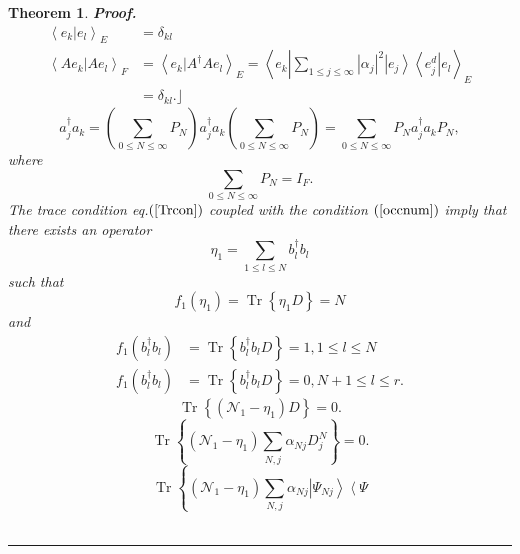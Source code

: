 \documentclass[aps,preprint]{revtex4}%
\newtheorem{theorem}{Theorem}
\newenvironment{proof}[1][Proof]{\noindent\textbf{#1.} }{\ \rule{0.5em}{0.5em}}
\begin{document}
\begin{theorem}
\begin{proof}
\begin{align}
\left\langle \left.  e_{k}\right\vert e_{l}\right\rangle _{E}  &  =\delta
_{kl}\\
\left\langle \left.  Ae_{k}\right\vert Ae_{l}\right\rangle _{F}  &
=\left\langle \left.  e_{k}\right\vert A^{\dagger}Ae_{l}\right\rangle
_{E}=\left\langle e_{k}\left\vert \sum_{1\leq j\leq\infty}\left\vert
\alpha_{j}\right\vert ^{2}\left\vert e_{j}\right\rangle \left\langle e_{j}%
^{d}\right\vert e_{l}\right.  \right\rangle _{E}\\
&  =\delta_{kl}.\rfloor
\end{align}%
\begin{equation}
a_{j}^{\dagger}a_{k}=\left(  \sum_{0\leq N\leq\infty}P_{N}\right)
a_{j}^{\dagger}a_{k}\left(  \sum_{0\leq N\leq\infty}P_{N}\right)  =\sum_{0\leq
N\leq\infty}P_{N}a_{j}^{\dagger}a_{k}P_{N},
\end{equation}
where%
\begin{equation}
\sum_{0\leq N\leq\infty}P_{N}=I_{F}.
\end{equation}
The trace condition eq.$\left(  \ref{Trcon}\right)  $ coupled with the
condition $\left(  \ref{occnum}\right)  $ imply that there exists an operator
\begin{equation}
\eta_{1}=\sum_{1\leq l\leq N}b_{l}^{\dagger}b_{l}%
\end{equation}
such that
\begin{equation}
f_{1}\left(  \eta_{1}\right)  =\operatorname*{Tr}\left\{  \eta_{1}D\right\}
=N
\end{equation}
and
\begin{align}
f_{1}\left(  b_{l}^{\dagger}b_{l}\right)   &  =\operatorname*{Tr}\left\{
b_{l}^{\dagger}b_{l}D\right\}  =1,1\leq l\leq N\\
f_{1}\left(  b_{l}^{\dagger}b_{l}\right)   &  =\operatorname*{Tr}\left\{
b_{l}^{\dagger}b_{l}D\right\}  =0,N+1\leq l\leq r.
\end{align}%
\begin{equation}
\operatorname*{Tr}\left\{  \left(  \mathcal{N}_{1}-\eta_{1}\right)  D\right\}
=0.
\end{equation}%
\begin{equation}
\operatorname*{Tr}\left\{  \left(  \mathcal{N}_{1}-\eta_{1}\right)  \sum
_{N,j}\alpha_{Nj}D_{j}^{N}\right\}  =0.
\end{equation}%
\begin{equation}
\operatorname*{Tr}\left\{  \left(  \mathcal{N}_{1}-\eta_{1}\right)  \sum
_{N,j}\alpha_{Nj}\left\vert \Psi_{Nj}\right\rangle \left\langle \Psi

\end{equation}
\end{proof}
\end{theorem}
\end{document}
